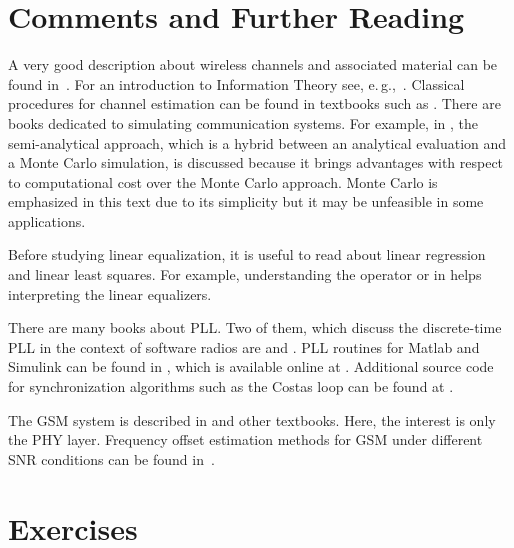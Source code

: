  

\section{Comments and Further Reading}

A very good description about wireless channels and associated material can be found in~\cite{Cho10}.
For an introduction to Information Theory see, e.\,g.,~\cite{Cover91}. Classical procedures for channel estimation can be found in textbooks such as \cite{Kay93}. 
There are books dedicated to simulating communication systems. For example, in \cite{Tranter04}, the semi-analytical approach, which is a hybrid between an analytical evaluation and a Monte Carlo simulation, is discussed because it brings advantages with respect to computational cost over the Monte Carlo approach. Monte Carlo is emphasized in this text due to its simplicity but it may be unfeasible in some applications.

Before studying linear equalization, it is useful to read about linear regression and linear least squares. For example, understanding the operator \ci{\textbackslash} or  in {\matlab} helps 
interpreting the linear equalizers.

There are many books about PLL. Two of them, which discuss the discrete-time PLL in
the context of software radios are \cite{Farhang10} and \cite{Miao07}. 
PLL routines for Matlab and Simulink can be found in \cite{Tranter10}, which is available
online at
.
Additional source code for synchronization algorithms such as the Costas loop can be found at
\cite{Farhang10,Johnson11}.

The GSM system is described in \cite{Yacoub02} and other textbooks. Here, the interest is only the PHY layer.
Frequency offset estimation methods for GSM under different SNR conditions can be found in~\cite{Hars99,Varma04}. 

\section{Exercises}

